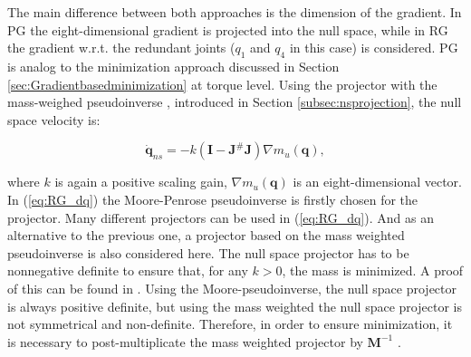The main difference between both approaches is the dimension of the gradient.  In PG the eight-dimensional gradient is projected into the null space, while in RG the gradient w.r.t. the redundant joints ($q_1$ and $q_4$ in this case) is considered.
PG is analog to the minimization approach discussed in Section \ref{sec:Gradientbasedminimization} at torque level. Using the projector  with the mass-weighed pseudoinverse \cite{khatib1995}, introduced in Section \ref{subsec:nsprojection}, the null space velocity is:

\begin{equation}
\mathbf{\dot{q}}_{ns} =  - k (\mathbf{I} -  \mathbf{J}^{\#} \mathbf{J} ) \nabla m_u(\mathbf{q}), \label{eq:RG_dq}
\end{equation}

where  $k$ is again a positive scaling gain,  $\nabla m_u(\mathbf{q})$ is an eight-dimensional vector.\\
%
%
%
%
%
In (\ref{eq:RG_dq}) the Moore-Penrose pseudoinverse is firstly chosen for the projector. 
Many different projectors can be used in (\ref{eq:RG_dq}). And as an alternative to the previous one, a projector based on the mass weighted pseudoinverse is also considered here. The null space projector has to be nonnegative definite to ensure that, for any $k > 0$, the mass is minimized. A proof of this can be found in \cite{yoshikawa}. Using the Moore-pseudoinverse, the null space projector is always positive definite, but using the mass weighted the null space projector is not symmetrical and non-definite. Therefore, in order to ensure minimization, it is necessary to post-multiplicate the mass weighted projector by $\mathbf{M}^{-1}$  \cite{Nemec}.  \\







